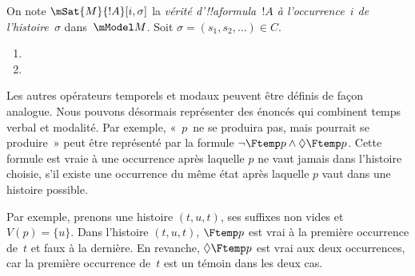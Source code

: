 \documentclass[../../../include/open-logic-section]{subfiles}
\begin{document}
\begin{defn}
  On note $\mSat{M}{!A}[i,\sigma]$ la \emph{vérité
  d'!!a{formula}~$!A$ à l'occurrence~$i$ de l'histoire~$\sigma$}
  dans~$\mModel M$. Soit $\sigma=(s_1,s_2,\ldots)\in C$.
  \begin{enumerate}
  \item{} 
  \item{} 
  \end{enumerate}
\end{defn}

Les autres opérateurs temporels et modaux peuvent être définis de
façon analogue. Nous pouvons désormais représenter des énoncés qui
combinent temps verbal et modalité. Par exemple, «~$p$~ne se produira
pas, mais pourrait se produire~» peut être représenté par la formule
$\lnot \Ftemp p \land \Diamond \Ftemp p$. Cette formule est vraie à une occurrence après laquelle $p$ ne
vaut jamais dans l'histoire choisie, s'il existe une occurrence
du même état après laquelle $p$ vaut dans une histoire possible.

Par exemple, prenons une histoire $(t,u,t)$, ses suffixes
non vides et $V(p)=\{u\}$. Dans l'histoire $(t,u,t)$,
$\Ftemp p$ est vrai à la première occurrence de~$t$ et faux
à la dernière. En revanche, $\Diamond\Ftemp p$ est vrai aux
deux occurrences, car la première occurrence de~$t$ est un
témoin dans les deux cas.
\end{document}
